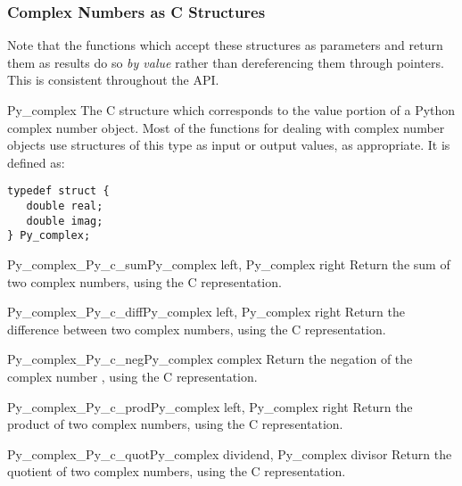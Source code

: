 \documentclass{manual}
\begin{document}
\subsubsection{Complex Numbers as C Structures}

Note that the functions which accept these structures as parameters
and return them as results do so \emph{by value} rather than
dereferencing them through pointers.  This is consistent throughout
the API.

\begin{ctypedesc}{Py_complex}
The C structure which corresponds to the value portion of a Python
complex number object.  Most of the functions for dealing with complex
number objects use structures of this type as input or output values,
as appropriate.  It is defined as:

\begin{verbatim}
typedef struct {
   double real;
   double imag;
} Py_complex;
\end{verbatim}
\end{ctypedesc}

\begin{cfuncdesc}{Py_complex}{_Py_c_sum}{Py_complex left, Py_complex right}
Return the sum of two complex numbers, using the C
 representation.
\end{cfuncdesc}

\begin{cfuncdesc}{Py_complex}{_Py_c_diff}{Py_complex left, Py_complex right}
Return the difference between two complex numbers, using the C
 representation.
\end{cfuncdesc}

\begin{cfuncdesc}{Py_complex}{_Py_c_neg}{Py_complex complex}
Return the negation of the complex number , using the C
 representation.
\end{cfuncdesc}

\begin{cfuncdesc}{Py_complex}{_Py_c_prod}{Py_complex left, Py_complex right}
Return the product of two complex numbers, using the C
 representation.
\end{cfuncdesc}

\begin{cfuncdesc}{Py_complex}{_Py_c_quot}{Py_complex dividend,
                                          Py_complex divisor}
Return the quotient of two complex numbers, using the C
 representation.
\end{cfuncdesc}
\end{document}
